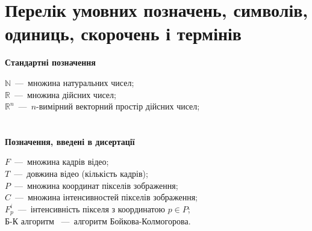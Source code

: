 \chapter*{Перелік умовних позначень, символів, одиниць, скорочень і термінів}

\textbf{Стандартні позначення}

 \noindent$\mathbb{N}$~---~множина натуральних чисел; \\
 \noindent$\mathbb{R}$~---~множина дійсних чисел; \\
 \noindent$\mathbb{R}^n$~---~$n$-вимірний векторний простір дійсних чисел; \\
\\
\\
\textbf{Позначення, введені в дисертації}

 \noindent$F$~---~множина кадрів відео; \\
 \noindent$T$~---~довжина відео (кількість кадрів); \\
 \noindent$P$~---~множина координат пікселів зображення; \\
 \noindent$C$~---~множина інтенсивностей пікселів зображення; \\
 \noindent$F_p^i$~---~інтенсивність пікселя з координатою $p$$\in$$P$; \\
 Б-К алгоритм ~---~алгоритм Бойкова-Колмогорова. \\
